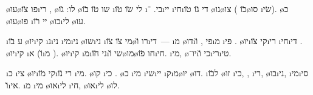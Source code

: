 
\o{עו}\o{פו}  \u{צו}\i{רי}   , \o{לו}: \u{גו} \o{שו}  \u{טו} \u{בו} \i{לי} \u{שו}  \u{טו} \i{בי}.  ־\i{יי} \i{חי}\i{די} \u{גו} \u{טו} \o{נו}\o{צו} (  \u{כו}\o{סו} \i{שׂי}). \o{כ} \o{עו}\o{פו}  \i{יי} \u{רו} \o{כו}\i{לי} \o{עו}.



\i{ע} \u{בו} \o{יו}\i{קי} \i{נ}\i{ני} \i{מי}\i{ני} \o{שו}\i{ני} \i{מי} \u{צו}  \u{צו}\o{רו} \u{ו}\i{די}~— \i{מ} \o{דו}\i{פי}  , \u{ו}\i{מ} \i{פּי}  . \o{יו}\i{קי}  \u{צו}\i{רי}    \i{חי}\i{די}    .  \o{יו}\i{קי}   \i{א} (\u{ו}\i{מ} ). \o{יו}\i{קי} \i{מ}\i{ני} \u{חו}\i{שי} \u{ו}\o{מו}\o{חו} \u{פו}\i{חי}.   \i{מי}, \o{יו}־\i{כי} \u{ו}\i{רי}\i{טי}.



\i{כ} \i{צי} \o{יו}\i{קי} \u{מו}\i{רי} \u{נו}  \i{מי}. \o{קו}   \i{כי} . \o{כ} \i{מי} \i{שי}\i{יי} \i{ק}\i{מ}\o{יו} \o{דו}. \i{ל}\u{בו} \o{זו} \i{כי},  , \i{רי}, \o{בו}\i{ני}, \i{מי}\i{סי} \u{ו}\i{אי}.  \i{מ} \i{מי} \o{או}\i{לי} \i{חי},  \o{או}\i{לי} \o{לו}.


